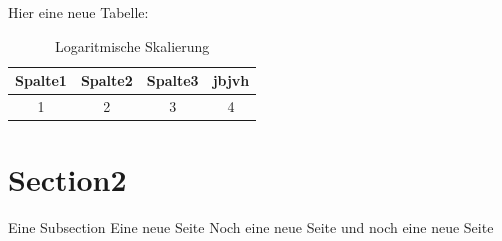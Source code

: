 Hier eine neue Tabelle:   
            
            \begin{table}[h]
                \begin{tabular}{cccc}
                      \hline
                      Spalte1 & Spalte2 & Spalte3 & jbjvh\\                      
                      \hline
                      1 & 2 & 3 & 4\\
                      \hline
                \end{tabular}
                \centering
                \caption{Logaritmische Skalierung}
                \label{Tab:Logaritmische Skalierung}
            \end{table}
 
        
        
    \section{Section2}
        Eine Subsection
        \newpage
        Eine neue Seite
        \newpage 
        Noch eine neue Seite
        \newpage    
        und noch eine neue Seite